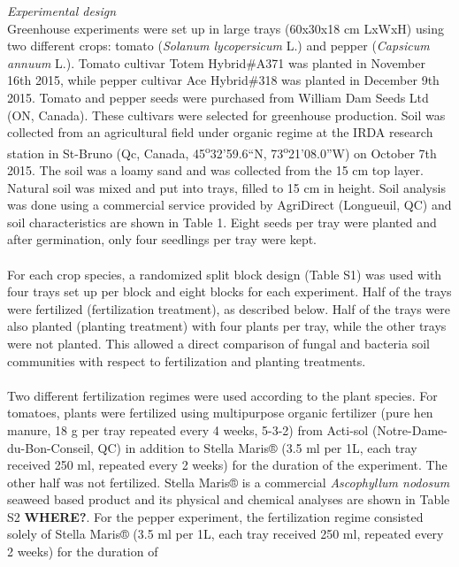 \documentclass[11pt,]{article}
\begin{document}
\emph{Experimental design}\\
Greenhouse experiments were set up in large trays (60x30x18 cm LxWxH)
using two different crops: tomato (\emph{Solanum lycopersicum} L.) and
pepper (\emph{Capsicum annuum} L.). Tomato cultivar Totem Hybrid\#A371
was planted in November 16th 2015, while pepper cultivar Ace Hybrid\#318
was planted in December 9th 2015. Tomato and pepper seeds were purchased
from William Dam Seeds Ltd (ON, Canada). These cultivars were selected
for greenhouse production. Soil was collected from an agricultural field
under organic regime at the IRDA research station in St-Bruno (Qc,
Canada, 45\textsuperscript{o}32'59.6``N,
73\textsuperscript{o}21'08.0''W) on October 7th 2015. The soil was a
loamy sand and was collected from the 15 cm top layer. Natural soil was
mixed and put into trays, filled to 15 cm in height. Soil analysis was
done using a commercial service provided by AgriDirect (Longueuil, QC)
and soil characteristics are shown in Table 1. Eight seeds per tray were
planted and after germination, only four seedlings per tray were kept.\\
\hspace*{0.333em}\\
For each crop species, a randomized split block design (Table S1) was
used with four trays set up per block and eight blocks for each
experiment. Half of the trays were fertilized (fertilization treatment),
as described below. Half of the trays were also planted (planting
treatment) with four plants per tray, while the other trays were not
planted. This allowed a direct comparison of fungal and bacteria soil
communities with respect to fertilization and planting treatments.\\
\hspace*{0.333em}\\
Two different fertilization regimes were used according to the plant
species. For tomatoes, plants were fertilized using multipurpose organic
fertilizer (pure hen manure, 18 g per tray repeated every 4 weeks,
5-3-2) from Acti-sol (Notre-Dame-du-Bon-Conseil, QC) in addition to
Stella Maris® (3.5 ml per 1L, each tray received 250 ml, repeated every
2 weeks) for the duration of the experiment. The other half was not
fertilized. Stella Maris® is a commercial \emph{Ascophyllum nodosum}
seaweed based product and its physical and chemical analyses are shown
in Table S2 \textbf{WHERE?}. For the pepper experiment, the
fertilization regime consisted solely of Stella Maris® (3.5 ml per 1L,
each tray received 250 ml, repeated every 2 weeks) for the duration of
\end{document}
